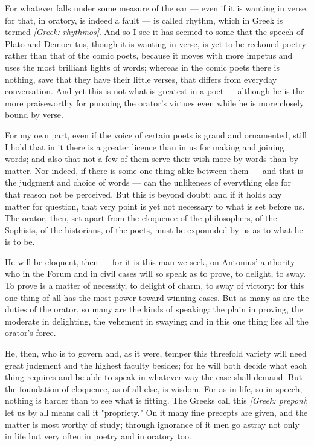  For whatever falls under some measure of the ear — even if it is wanting in verse, for that, in oratory, is indeed a fault — is called rhythm, which in Greek is termed \textit{[Greek: rhythmos]}. And so I see it has seemed to some that the speech of Plato and Democritus, though it is wanting in verse, is yet to be reckoned poetry rather than that of the comic poets, because it moves with more impetus and uses the most brilliant lights of words; whereas in the comic poets there is nothing, save that they have their little verses, that differs from everyday conversation. And yet this is not what is greatest in a poet — although he is the more praiseworthy for pursuing the orator's virtues even while he is more closely bound by verse.

 For my own part, even if the voice of certain poets is grand and ornamented, still I hold that in it there is a greater licence than in us for making and joining words; and also that not a few of them serve their wish more by words than by matter. Nor indeed, if there is some one thing alike between them — and that is the judgment and choice of words — can the unlikeness of everything else for that reason not be perceived. But this is beyond doubt; and if it holds any matter for question, that very point is yet not necessary to what is set before us. The orator, then, set apart from the eloquence of the philosophers, of the Sophists, of the historians, of the poets, must be expounded by us as to what he is to be.

 He will be eloquent, then — for it is this man we seek, on Antonius' authority — who in the Forum and in civil cases will so speak as to prove, to delight, to sway. To prove is a matter of necessity, to delight of charm, to sway of victory: for this one thing of all has the most power toward winning cases. But as many as are the duties of the orator, so many are the kinds of speaking: the plain in proving, the moderate in delighting, the vehement in swaying; and in this one thing lies all the orator's force.

 He, then, who is to govern and, as it were, temper this threefold variety will need great judgment and the highest faculty besides; for he will both decide what each thing requires and be able to speak in whatever way the case shall demand. But the foundation of eloquence, as of all else, is wisdom. For as in life, so in speech, nothing is harder than to see what is fitting. The Greeks call this \textit{[Greek: prepon]}; let us by all means call it "propriety." On it many fine precepts are given, and the matter is most worthy of study; through ignorance of it men go astray not only in life but very often in poetry and in oratory too.

